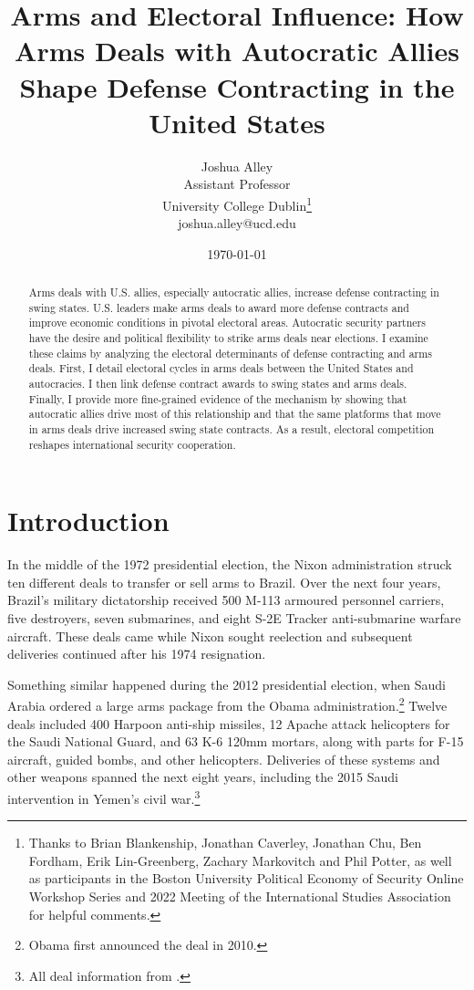 \documentclass[12pt]{article}
\title{\textbf{Arms and Electoral Influence: How Arms Deals with Autocratic Allies Shape Defense Contracting in the United States}}
\author{Joshua Alley \\
Assistant Professor \\
University College Dublin\thanks{Thanks to Brian Blankenship, Jonathan Caverley, Jonathan Chu, Ben Fordham, Erik Lin-Greenberg, Zachary Markovitch and Phil Potter, as well as participants in the Boston University Political Economy of Security Online Workshop Series and 2022 Meeting of the International Studies Association for helpful comments.} \\
joshua.alley@ucd.edu
}
\date{\today}
\begin{document}
\maketitle 

\begin{abstract} 
Arms deals with U.S. allies, especially autocratic allies, increase defense contracting in swing states. 
U.S. leaders make arms deals to award more defense contracts and improve economic conditions in pivotal electoral areas.
Autocratic security partners have the desire and political flexibility to strike arms deals near elections. 
I examine these claims by analyzing the electoral determinants of defense contracting and arms deals.  
First, I detail electoral cycles in arms deals between the United States and autocracies. 
I then link defense contract awards to swing states and arms deals.
Finally, I provide more fine-grained evidence of the mechanism by showing that autocratic allies drive most of this relationship and that the same platforms that move in arms deals drive increased swing state contracts.  
As a result, electoral competition reshapes international security cooperation.
\end{abstract} 


\newpage 
\doublespace 


\section{Introduction}



In the middle of the 1972 presidential election, the Nixon administration struck ten different deals to transfer or sell arms to Brazil.
Over the next four years, Brazil's military dictatorship received 500 M-113 armoured personnel carriers, five destroyers, seven submarines, and eight S-2E Tracker anti-submarine warfare aircraft.
These deals came while Nixon sought reelection and subsequent deliveries continued after his 1974 resignation. 


Something similar happened during the 2012 presidential election, when Saudi Arabia ordered a large arms package from the Obama administration.\footnote{Obama first announced the deal in 2010.} 
Twelve deals included 400 Harpoon anti-ship missiles, 12 Apache attack helicopters for the Saudi National Guard, and 63 K-6 120mm mortars, along with parts for F-15 aircraft, guided bombs, and other helicopters. 
Deliveries of these systems and other weapons spanned the next eight years, including the 2015 Saudi intervention in Yemen's civil war.\footnote{All deal information from \citep{Sipri2022}.}
\end{document}

